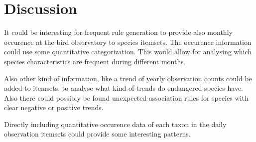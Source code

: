 \documentclass[english]{tktltiki2}
\begin{document}
\section{Discussion}

It could be interesting for frequent rule generation to provide also monthly occurence at the bird observatory to species itemsets. The occurence information could use some quantitative categorization. This would allow for analysing which species characteristics are frequent during different months.

Also other kind of information, like a trend of yearly observation counts could be added to itemsets, to analyse what kind of trends do endangered species have. Also there could possibly be found unexpected association rules for species with clear negative or positive trends.

Directly including quantitative occurence data of each taxon in the daily observation itemsets could provide some interesting patterns.

\pagebreak

%
%
% 
%




\lastpage
\end{document}
